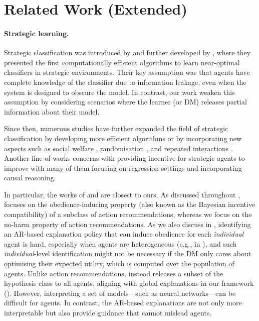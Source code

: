 \section{Related Work (Extended)}\label{apx:extended-related-work}

\paragraph{Strategic learning.} Strategic classification was introduced by \citet{bruckner2012static} and further developed by \citet{hardt2016strategic}, where they presented the first computationally efficient algorithms to learn near-optimal classifiers in strategic environments. Their key assumption was that agents have complete knowledge of the classifier due to information leakage, even when the system is designed to obscure the model. In contrast, our work weaken this assumption by considering scenarios where the learner (or DM) releases partial information about their model.


Since then, numerous studies have further expanded the field of strategic classification by developing more efficient algorithms \citep{dong2018strategic, levanon2021strategic, ahmadi2021strategic} or by incorporating new aspects such as social welfare \citep{hu2018disparate, milli2019social}, randomisation \citep{sundaram2023pac, ahmadi2023fundamental, shao2024strategic}, and repeated interactions \citep{harris2021stateful, cohen2023sequential}. Another line of works concerns with providing incentive for strategic agents to improve \citep{kleinberg2020classifiers, shavit2020causal, harris2022strategic, horowitz2023causal, vo2024causal} with many of them focusing on regression settings and incorporating causal reasoning.

In particular, the works of \citet{harris2022bayesian} and \citet{cohen2024bayesian} are closest to ours. As discussed throughout , \citet{harris2022bayesian} focuses on the obedience-inducing property (also known as the Bayesian incentive compatibility) of a subclass of action recommendations, whereas we focus on the no-harm property of action recommendations. 
As we also discuss in , identifying an AR-based explanation policy that can induce obedience for each \textit{individual} agent is hard, especially when agents are heterogeneous (e.g., in \citet{harris2022strategic,shao2024strategic}), and such \textit{individual}-level identification might not be necessary if the DM only cares about optimising their expected utility, which is computed over the population of agents.
Unlike action recommendations, \citet{cohen2024bayesian} instead releases a subset of the hypothesis class to all agents, aligning with global explanations in our framework (). However, interpreting a set of models—such as neural networks—can be difficult for agents. In contrast, the AR-based explanations are not only more interpretable but also provide guidance that cannot mislead agents.

